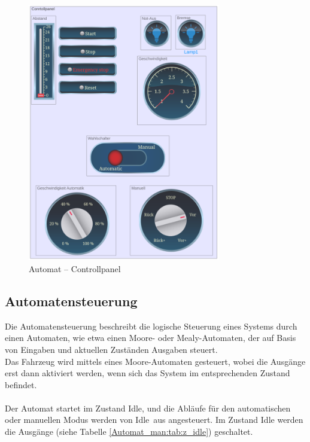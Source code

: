 \pagebreak[1]
\begin{figure}[!ht]
	\begin{center}
		\includegraphics[width=0.75\textwidth]{img/5_simulation/Automat_con.png}
		\caption{Automat – Controllpanel}
		\label{Controllpanel:img:Controllpanel}
	\end{center}
\end{figure}
\pagebreak[4]


\subsection{Automatensteuerung}
\label{Automatensteuerung}
Die Automatensteuerung beschreibt die logische Steuerung eines Systems durch einen Automaten, wie etwa einen Moore- oder Mealy-Automaten, der auf Basis von Eingaben und aktuellen Zuständen Ausgaben steuert.\\
Das Fahrzeug wird mittels eines Moore-Automaten gesteuert, wobei die Ausgänge erst dann aktiviert werden, wenn sich das System im entsprechenden Zustand befindet.\\ \ \\
Der Automat startet im Zustand \frqq Idle\flqq, und die Abläufe für den automatischen oder manuellen Modus werden von \frqq Idle\flqq\ aus angesteuert. Im Zustand Idle werden die Ausgänge (siehe Tabelle \ref{Automat_man:tab:z_idle}) geschaltet.\\


